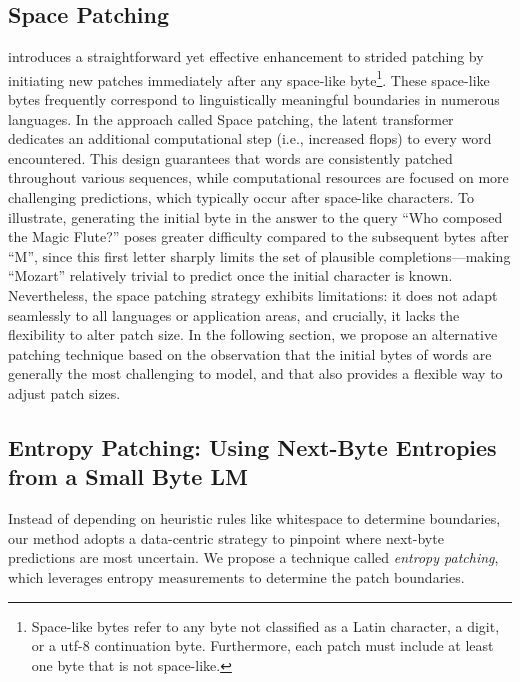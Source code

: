\subsection{Space Patching}
\label{section:white-patch}

\citet{slagle2024spacebyte} introduces a straightforward yet effective enhancement to strided patching by initiating new patches immediately after any space-like byte\footnote{
    Space-like bytes refer to any byte not classified as a Latin character, a digit, or a utf-8 continuation byte. Furthermore, each patch must include at least one byte that is not space-like. }. These space-like bytes frequently correspond to linguistically meaningful boundaries in numerous languages. In the approach called Space patching, the latent transformer dedicates an additional computational step (i.e., increased flops) to every word encountered. This design guarantees that words are consistently patched throughout various sequences, while computational resources are focused on more challenging predictions, which typically occur after space-like characters. To illustrate, generating the initial byte in the answer to the query ``Who composed the Magic Flute?\uline{\hspace{.6em}}'' poses greater difficulty compared to the subsequent bytes after ``M'', since this first letter sharply limits the set of plausible completions—making ``Mozart'' relatively trivial to predict once the initial character is known. Nevertheless, the space patching strategy exhibits limitations: it does not adapt seamlessly to all languages or application areas, and crucially, it lacks the flexibility to alter patch size. In the following section, we propose an alternative patching technique based on the observation that the initial bytes of words are generally the most challenging to model, and that also provides a flexible way to adjust patch sizes.

\subsection{Entropy Patching: Using Next-Byte Entropies from a Small Byte LM}
\label{section:dyn-patch}

Instead of depending on heuristic rules like whitespace to determine boundaries, our method adopts a data-centric strategy to pinpoint where next-byte predictions are most uncertain. We propose a technique called \textit{entropy patching}, which leverages entropy measurements to determine the patch boundaries.

